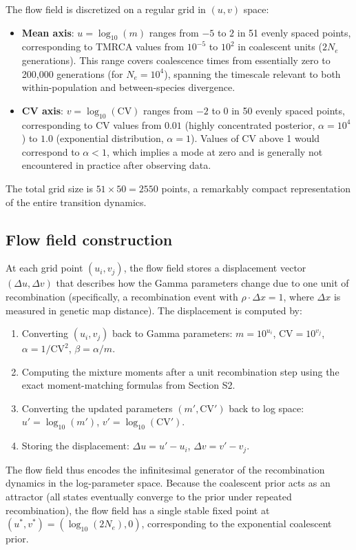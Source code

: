 \documentclass[10pt,letterpaper]{article}
\begin{document}
The flow field is discretized on a regular grid in $(u, v)$ space:
\begin{itemize}
\item \textbf{Mean axis}: $u = \log_{10}(m)$ ranges from $-5$ to $2$ in 51 evenly spaced points, corresponding to TMRCA values from $10^{-5}$ to $10^{2}$ in coalescent units ($2N_e$ generations). This range covers coalescence times from essentially zero to 200,000 generations (for $N_e = 10^4$), spanning the timescale relevant to both within-population and between-species divergence.
\item \textbf{CV axis}: $v = \log_{10}(\mathrm{CV})$ ranges from $-2$ to $0$ in 50 evenly spaced points, corresponding to CV values from $0.01$ (highly concentrated posterior, $\alpha = 10^4$) to $1.0$ (exponential distribution, $\alpha = 1$). Values of CV above 1 would correspond to $\alpha < 1$, which implies a mode at zero and is generally not encountered in practice after observing data.
\end{itemize}
The total grid size is $51 \times 50 = 2550$ points, a remarkably compact representation of the entire transition dynamics.

\subsection{Flow field construction}

At each grid point $(u_i, v_j)$, the flow field stores a displacement vector $(\Delta u, \Delta v)$ that describes how the Gamma parameters change due to one unit of recombination (specifically, a recombination event with $\rho \cdot \Delta x = 1$, where $\Delta x$ is measured in genetic map distance). The displacement is computed by:
\begin{enumerate}
\item Converting $(u_i, v_j)$ back to Gamma parameters: $m = 10^{u_i}$, $\mathrm{CV} = 10^{v_j}$, $\alpha = 1/\mathrm{CV}^2$, $\beta = \alpha/m$.
\item Computing the mixture moments after a unit recombination step using the exact moment-matching formulas from Section S2.
\item Converting the updated parameters $(m', \mathrm{CV}')$ back to log space: $u' = \log_{10}(m')$, $v' = \log_{10}(\mathrm{CV}')$.
\item Storing the displacement: $\Delta u = u' - u_i$, $\Delta v = v' - v_j$.
\end{enumerate}

The flow field thus encodes the infinitesimal generator of the recombination dynamics in the log-parameter space. Because the coalescent prior acts as an attractor (all states eventually converge to the prior under repeated recombination), the flow field has a single stable fixed point at $(u^*, v^*) = (\log_{10}(2N_e), 0)$, corresponding to the exponential coalescent prior.
\end{document}
